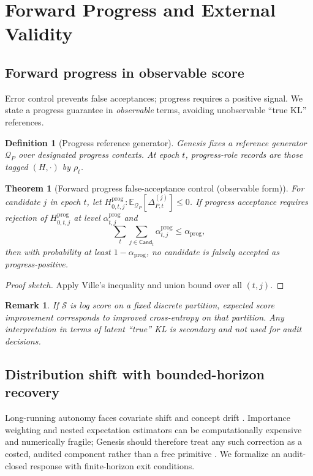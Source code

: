 \documentclass[11pt,a4paper]{article}
\newtheorem{theorem}{Theorem}[section]
\newtheorem{definition}{Definition}[section]
\newtheorem{remark}{Remark}[section]
\newcommand{\Cand}{\mathsf{Cand}}
\begin{document}
\section{Forward Progress and External Validity}

\subsection{Forward progress in observable score}
Error control prevents false acceptances; progress requires a positive signal.
We state a progress guarantee in \emph{observable} terms, avoiding unobservable ``true KL'' references.

\begin{definition}[Progress reference generator]
Genesis fixes a reference generator $\mathcal{Q}_P$ over designated progress contexts.
At epoch $t$, progress-role records are those tagged $(H,\cdot)$ by $\rho_t$.
\end{definition}

\begin{theorem}[Forward progress false-acceptance control (observable form)]
\label{thm:progress}
For candidate $j$ in epoch $t$, let $H^{\mathrm{prog}}_{0,t,j}:\mathbb{E}_{\mathcal{Q}_P}[\Delta_{P,t}^{(j)}]\le 0$.
If progress acceptance requires rejection of $H^{\mathrm{prog}}_{0,t,j}$ at level $\alpha^{\mathrm{prog}}_{t,j}$ and
\[
\sum_t\sum_{j\in\Cand_t}\alpha^{\mathrm{prog}}_{t,j}\le \alpha_{\mathrm{prog}},
\]
then with probability at least $1-\alpha_{\mathrm{prog}}$, no candidate is falsely accepted as progress-positive.
\end{theorem}
\begin{proof}[Proof sketch]
Apply Ville's inequality and union bound over all $(t,j)$.
\end{proof}

\begin{remark}
If $\mathcal{S}$ is log score on a fixed discrete partition, expected score improvement corresponds to improved cross-entropy on that partition.
Any interpretation in terms of latent ``true'' KL is secondary and not used for audit decisions.
\end{remark}

\subsection{Distribution shift with bounded-horizon recovery}
Long-running autonomy faces covariate shift and concept drift \citep{SugiyamaKawanabe2012,Gama2014ConceptDrift}.
Importance weighting and nested expectation estimators can be computationally expensive and numerically fragile; Genesis should therefore treat any such correction as a costed, audited component rather than a free primitive \citep{Rainforth2018NestingMC}.
We formalize an audit-closed response with finite-horizon exit conditions.
\end{document}
